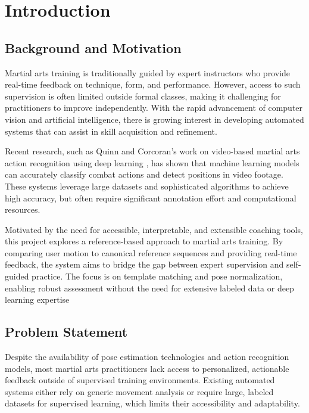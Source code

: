 \documentclass[12pt]{article}
\begin{document}
{\selectfont

\section{Introduction}
\subsection{Background and Motivation}
Martial arts training is traditionally guided by expert instructors who provide real-time feedback on technique, form, and performance. However, access to such supervision is often limited outside formal classes, making it challenging for practitioners to improve independently. With the rapid advancement of computer vision and artificial intelligence, there is growing interest in developing automated systems that can assist in skill acquisition and refinement.

Recent research, such as Quinn and Corcoran's work on video-based martial arts action recognition using deep learning \cite{martialartsDL2023}, has shown that machine learning models can accurately classify combat actions and detect positions in video footage. These systems leverage large datasets and sophisticated algorithms to achieve high accuracy, but often require significant annotation effort and computational resources.

Motivated by the need for accessible, interpretable, and extensible coaching tools, this project explores a reference-based approach to martial arts training. By comparing user motion to canonical reference sequences and providing real-time feedback, the system aims to bridge the gap between expert supervision and self-guided practice. The focus is on template matching and pose normalization, enabling robust assessment without the need for extensive labeled data or deep learning expertise



\subsection{Problem Statement}
Despite the availability of pose estimation technologies and action recognition models, most martial arts practitioners lack access to personalized, actionable feedback outside of supervised training environments. Existing automated systems either rely on generic movement analysis or require large, labeled datasets for supervised learning, which limits their accessibility and adaptability.

}
\end{document}
